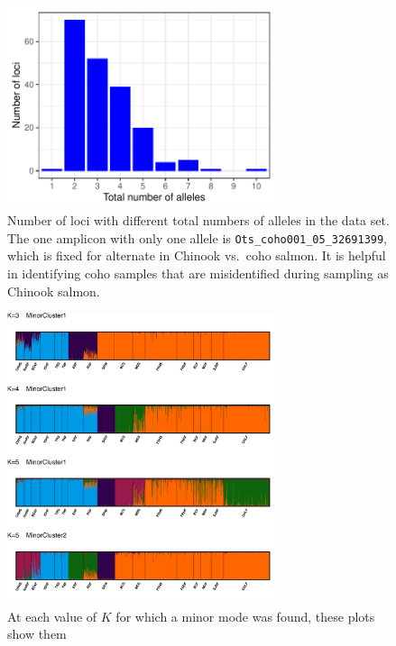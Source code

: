\begin{figure}
\begin{center}
\includegraphics[width=0.7\textwidth]{images/num-alle-barplot.pdf}
\end{center}
\caption[Number of loci with different
total numbers of alleles]{\footnotesize Number of loci with different
total numbers of alleles in the data set. The one amplicon with only
one allele is {\tt Ots\_coho001\_05\_32691399}, which is fixed for alternate
in Chinook vs.\ coho salmon. It is helpful in identifying coho samples that are
misidentified during sampling as Chinook salmon.}
\label{fig:num-alle}
\end{figure}




\begin{figure}
\begin{center}
\includegraphics[width=0.7\textwidth]{images/minor-modes-crop.pdf}
\end{center}
\caption[STRUCTURE minor modes found by CLUMPAK]{\footnotesize At each value of $K$
for which a minor mode was found, these plots show them}
\label{fig:minor-modes}
\end{figure}


